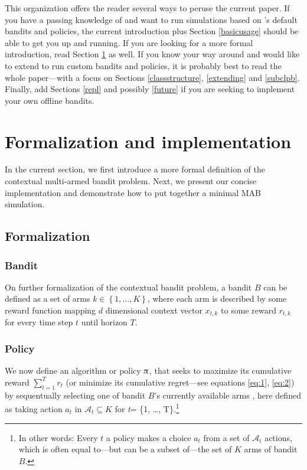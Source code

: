\documentclass{jss}
\begin{document}
This organization offers the reader several ways to peruse the current paper. If you have a passing knowledge of  and want to run simulations based on 's default bandits and policies, the current introduction plus Section \ref{basicusage} should be able to get you up and running. If you are looking for a more formal introduction, read Section \ref{formalizationandimplementation} as well. If you know your way around  and would like to extend  to run custom bandits and policies, it is probably best to read the whole paper---with a focus on Sections \ref{classstructure}, \ref{extending} and \ref{subclpb}. Finally, add Sections \ref{repl} and possibly \ref{future} if you are seeking to implement your own offline bandits.

\section{Formalization and implementation} \label{formalizationandimplementation}

In the current section, we first introduce a more formal definition of the contextual multi-armed bandit problem. Next, we present our concise implementation and demonstrate how to put together a minimal MAB simulation.

\subsection{Formalization} \label{formalization}

\subsubsection{Bandit} \label{formalization}

On further formalization of the contextual bandit problem, a bandit $B$ can be defined as a set of arms \(k \in \left\{ 1, \dots, K \right\}\), where each arm is described by some reward function mapping $d$ dimensional context vector $x_{t,k}$ to some reward $r_{t,k}$ \citep{Auer2002,Langford2008} for every time step $t$ until horizon $T$.

\subsubsection{Policy} \label{formalization}

We now define an algorithm or policy $\piup$, that seeks to maximize its cumulative reward $\sum_{t=1}^T r_t$ (or minimize its cumulative regret---see equations \ref{eq:1}, \ref{eq:2}) by sequentually selecting one of bandit $B$'s currently available arms \citep{Bubeck2012}, here defined as taking action $a_t$ in $\mathcal{A}_t \subseteq K$ for \emph{t}= \{1, \ldots, T\}.\footnote{In other words: Every $t$ a policy makes a choice $a_t$ from a set of $\mathcal{A}_t$ actions, which is often equal to---but can be a subset of---the set of $K$ arms of bandit $B$.}
\end{document}
